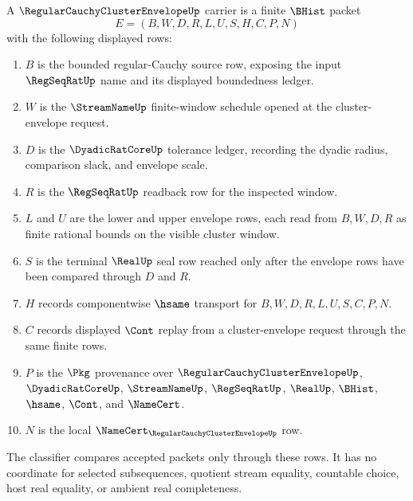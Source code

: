 \begin{definition}
\label{def:regular-cauchy-cluster-envelope-carrier}
A $\RegularCauchyClusterEnvelopeUp$ carrier is a finite $\BHist$ packet
$$
E=(B,W,D,R,L,U,S,H,C,P,N)
$$
with the following displayed rows:
\begin{enumerate}
\item $B$ is the bounded regular-Cauchy source row, exposing the input $\RegSeqRatUp$ name and its displayed boundedness ledger.
\item $W$ is the $\StreamNameUp$ finite-window schedule opened at the cluster-envelope request.
\item $D$ is the $\DyadicRatCoreUp$ tolerance ledger, recording the dyadic radius, comparison slack, and envelope scale.
\item $R$ is the $\RegSeqRatUp$ readback row for the inspected window.
\item $L$ and $U$ are the lower and upper envelope rows, each read from $B,W,D,R$ as finite rational bounds on the visible cluster window.
\item $S$ is the terminal $\RealUp$ seal row reached only after the envelope rows have been compared through $D$ and $R$.
\item $H$ records componentwise $\hsame$ transport for $B,W,D,R,L,U,S,C,P,N$.
\item $C$ records displayed $\Cont$ replay from a cluster-envelope request through the same finite rows.
\item $P$ is the $\Pkg$ provenance over $\RegularCauchyClusterEnvelopeUp$, $\DyadicRatCoreUp$, $\StreamNameUp$, $\RegSeqRatUp$, $\RealUp$, $\BHist$, $\hsame$, $\Cont$, and $\NameCert$.
\item $N$ is the local $\NameCert_{\RegularCauchyClusterEnvelopeUp}$ row.
\end{enumerate}
The classifier compares accepted packets only through these rows. It has no coordinate for selected subsequences, quotient stream equality, countable choice, host real equality, or ambient real completeness.
\end{definition}

